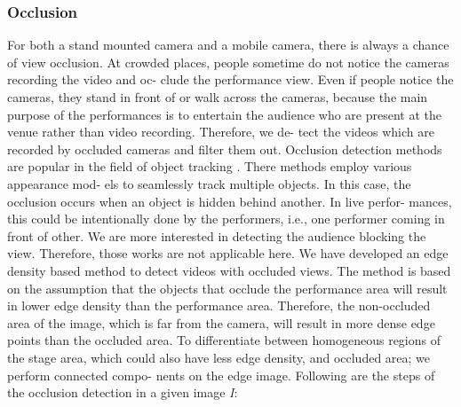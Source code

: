 \documentclass{sig-alternate}
\providecommand{\DIFadd}[1]{{\protect\color{blue}\uwave{#1}}} %
\providecommand{\DIFaddbegin}{} %
\providecommand{\DIFaddend}{} %
\begin{document}
\subsubsection{Occlusion}
\DIFaddbegin \DIFadd{I am a new sentence.
}\DIFaddend For both a stand mounted camera and a mobile camera, there
is always a chance of view occlusion. At crowded places, people
sometime do not notice the cameras recording the video and oc-
clude the performance view. Even if people notice the cameras,
they stand in front of or walk across the cameras, because the main
purpose of the performances is to entertain the audience who are
present at the venue rather than video recording. Therefore, we de-
tect the videos which are recorded by occluded cameras and filter
them out.
Occlusion detection methods are popular in the field of object
tracking \cite{salas:thirteen}\cite{salas:nineteen}. There methods employ various appearance mod-
els to seamlessly track multiple objects. In this case, the occlusion
occurs when an object is hidden behind another. In live perfor-
mances, this could be intentionally done by the performers, i.e.,
one performer coming in front of other. We are more interested in
detecting the audience blocking the view. Therefore, those works
are not applicable here.
We have developed an edge density based method to detect videos
with occluded views. The method is based on the assumption that
the objects that occlude the performance area will result in lower
edge density than the performance area. Therefore, the non-occluded
area of the image, which is far from the camera, will result in more
dense edge points than the occluded area. To differentiate between
homogeneous regions of the stage area, which could also have less
edge density, and occluded area; we perform connected compo-
nents on the edge image. Following are the steps of the occlusion
detection in a given image \textit{I}:
\end{document}
